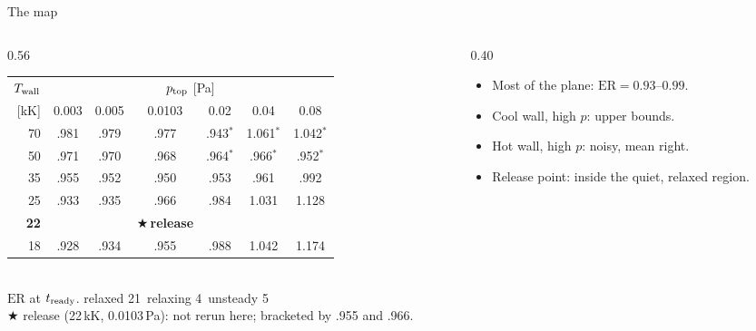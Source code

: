 \documentclass[aspectratio=169,10pt]{beamer}
\newcommand{\Twall}{T_{\rm wall}}
\newcommand{\ptop}{p_{\rm top}}
\newcommand{\ER}{\mathrm{ER}}
\begin{document}
\begin{frame}{The map}
  \begin{columns}[c]
    \begin{column}{0.56\textwidth}
      \centering
      \renewcommand{\arraystretch}{1.5}
      \footnotesize
      \setlength{\tabcolsep}{4pt}
      \begin{tabular}{r|cccccc}
        $\Twall$ & \multicolumn{6}{c}{$\ptop$ [Pa]} \\
        {[kK]} & 0.003 & 0.005 & 0.0103 & 0.02 & 0.04 & 0.08 \\
        \hline
        70 & \cellcolor{relaxed}.981 & \cellcolor{relaxed}.979 & \cellcolor{relaxed}.977
           & \cellcolor{unsteady}.943$^\ast$ & \cellcolor{unsteady}1.061$^\ast$ & \cellcolor{unsteady}1.042$^\ast$ \\
        50 & \cellcolor{relaxed}.971 & \cellcolor{relaxed}.970 & \cellcolor{relaxed}.968
           & \cellcolor{relaxed}.964$^\ast$ & \cellcolor{unsteady}.966$^\ast$ & \cellcolor{unsteady}.952$^\ast$ \\
        35 & \cellcolor{relaxed}.955 & \cellcolor{relaxed}.952 & \cellcolor{relaxed}.950
           & \cellcolor{relaxed}.953 & \cellcolor{relaxed}.961 & \cellcolor{relaxed}.992 \\
        25 & \cellcolor{relaxed}.933 & \cellcolor{relaxed}.935 & \cellcolor{relaxed}.966
           & \cellcolor{relaxed}.984 & \cellcolor{relaxing}1.031 & \cellcolor{relaxing}1.128 \\
        \textcolor{release}{\textbf{22}} & & & \textcolor{release}{$\bigstar$\,\textbf{release}} & & & \\
        18 & \cellcolor{relaxed}.928 & \cellcolor{relaxed}.934 & \cellcolor{relaxed}.955
           & \cellcolor{relaxed}.988 & \cellcolor{relaxing}1.042 & \cellcolor{relaxing}1.174 \\
      \end{tabular}\\[6pt]
      \scriptsize $\ER$ at $t_{\rm ready}$.\quad
      \colorbox{relaxed}{relaxed 21}\ \colorbox{relaxing}{relaxing 4}\
      \colorbox{unsteady}{unsteady 5}\\[3pt]
      \textcolor{release}{$\bigstar$} release (22\,kK, 0.0103\,Pa): not rerun here;
      bracketed by .955 and .966.
    \end{column}
    \begin{column}{0.40\textwidth}
      \small
      \begin{itemize}\itemsep8pt
        \item Most of the plane: $\ER = 0.93$--$0.99$.
        \item Cool wall, high $p$: upper bounds.
        \item Hot wall, high $p$: noisy, mean right.
        \item \textcolor{release}{Release point}: inside the quiet, relaxed
              region.
      \end{itemize}
    \end{column}
  \end{columns}
\end{frame}
\end{document}
